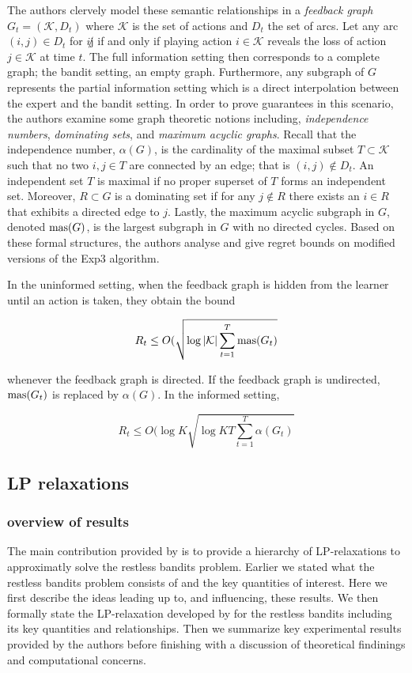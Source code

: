 The authors clervely model these semantic relationships in a \textit{feedback graph} $G_t=(\mathcal{K},D_t)$ where $\mathcal{K}$ is the set of actions and $D_t$ the set of arcs. Let any arc $(i,j)\in D_t$ for $i\not j$ if and only if playing action $i\in\mathcal{K}$ reveals the loss of action $j\in \mathcal{K}$ at time $t$. The full information setting then corresponds to a complete graph; the bandit setting, an empty graph. Furthermore, any subgraph of $G$ represents the partial information setting which is a direct interpolation between the expert and the bandit setting. In order to prove guarantees in this scenario, the authors examine some graph theoretic notions including, \textit{independence numbers}, \textit{dominating sets}, and \textit{maximum acyclic graphs}. Recall that the independence number, $\alpha(G)$, is the cardinality of the maximal subset $T\subset \mathcal{K}$ such that no two $i,j\in T$ are connected by an edge; that is $(i,j)\not\in D_t$. An independent set $T$ is maximal if no proper superset of $T$ forms an independent set. Moreover, $R\subset G$ is a dominating set if for any $j\not\in R$ there exists an $i\in R$ that exhibits a directed edge to $j$. Lastly, the maximum acyclic subgraph in $G$, denoted $\text{mas}(G)$, is the largest subgraph in $G$ with no directed cycles. Based on these formal structures, the authors analyse and give regret bounds on modified versions of the Exp3 algorithm. 

In the uninformed setting, when the feedback graph is hidden from the learner until an action is taken, they obtain the bound

$$R_t\leq O(\sqrt{\log |\mathcal{K}|\sum_{t=1}^T\text{mas}(G_t)}$$

whenever the feedback graph is directed. If the feedback graph is undirected, $\text{mas}(G_t)$ is replaced by $\alpha(G)$. In the informed setting, 

$$R_t \leq O(\log K\sqrt{\log KT\sum_{t=1}^T\alpha(G_t)}$$

\subsection{LP relaxations}

\subsubsection{overview of results}
The main contribution provided by \citep{bertsimas} is to provide a hierarchy of LP-relaxations
to approximatly solve the restless bandits problem. Earlier we stated what the restless
bandits problem consists of and the key quantities of interest. Here we first describe the ideas leading up to, and influencing, these results. We then formally state the LP-relaxation developed by \citep{bertsimas} for the restless bandits including its key quantities and relationships. Then we summarize key experimental results provided by the authors before finishing with a discussion of theoretical findinings and computational concerns.

